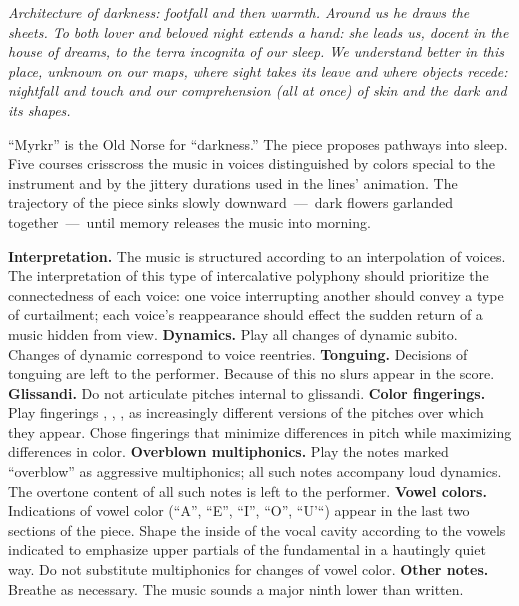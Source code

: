 \textit{Architecture of darkness: footfall and then warmth. Around us he draws
the sheets. To both lover and beloved night extends a hand: she leads us,
docent in the house of dreams, to the terra incognita of our sleep. We
understand better in this place, unknown on our maps, where sight takes its
leave and where objects recede: nightfall and touch and our comprehension (all
at once) of skin and the dark and its shapes.}

``Myrkr'' is the Old Norse for ``darkness.'' The piece proposes pathways into
sleep. Five courses crisscross the music in voices distinguished by colors
special to the instrument and by the jittery durations used in the lines'
animation. The trajectory of the piece sinks slowly downward~---~dark flowers
garlanded together~---~until memory releases the music into morning.

\textbf{Interpretation.} The music is structured according to an interpolation
of voices. The interpretation of this type of intercalative polyphony should
prioritize the connectedness of each voice: one voice interrupting another
should convey a type of curtailment; each voice's reappearance should effect
the sudden return of a music hidden from view. \textbf{Dynamics.} Play all
changes of dynamic subito. Changes of dynamic correspond to voice reentries.
\textbf{Tonguing.} Decisions of tonguing are left to the performer. Because of
this no slurs appear in the score. \textbf{Glissandi.} Do not articulate
pitches internal to glissandi. \textbf{Color fingerings.} Play fingerings
, , ,  as increasingly different
versions of the pitches over which they appear. Chose fingerings that minimize
differences in pitch while maximizing differences in color. \textbf{Overblown
multiphonics.} Play the notes marked ``overblow'' as aggressive multiphonics;
all such notes accompany loud dynamics. The overtone content of all such notes
is left to the performer. \textbf{Vowel colors.} Indications of vowel color
(``A'', ``E'', ``I'', ``O'', ``U'``) appear in the last two sections of the
piece. Shape the inside of the vocal cavity according to the vowels indicated
to emphasize upper partials of the fundamental in a hautingly quiet way. Do not
substitute multiphonics for changes of vowel color. \textbf{Other notes.}
Breathe as necessary. The music sounds a major ninth lower than written.
